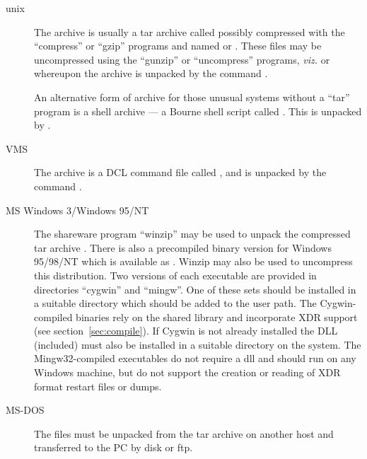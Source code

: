 \documentclass[a4paper,twoside]{report}
\begin{document}
\begin{description}
\item[unix] The archive is usually a tar archive called
   possibly compressed with the ``compress'' or
  ``gzip'' programs and named  or
  . These files may be uncompressed using the
  ``gunzip''  or ``uncompress'' programs, \emph{viz.}
   or  whereupon
  the archive is unpacked by the command .
  
  An alternative form of archive for those unusual systems without a
  ``tar'' program is a shell archive --- a Bourne shell script called
  . This is unpacked by .  

\item[VMS]  The archive is a DCL command file called ,
and is unpacked by the command .

\item[MS Windows 3/Windows 95/NT] The shareware program ``winzip'' may
  be used to unpack the compressed tar archive .
  There is also a precompiled binary version for Windows 95/98/NT
  which is available as .  Winzip may also be used to
  uncompress this distribution.  Two versions of each executable are
  provided in directories ``cygwin'' and ``mingw''.  One of these sets
  should be installed in a suitable directory which should be added to
  the user path.  The Cygwin-compiled binaries rely on the shared
  library  and incorporate XDR support (see
  section~\ref{sec:compile}).  If Cygwin is not already installed the
  DLL (included) must also be installed in a suitable directory on the
  system.  The Mingw32-compiled executables do not require a dll and
  should run on any Windows machine, but do not support the creation
  or reading of XDR format restart files or dumps.

\item[MS-DOS] The files must be unpacked from the tar archive on
another host and transferred to the PC by disk or ftp.

\end{description}


\end{document}
